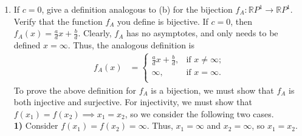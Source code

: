 \documentclass[a4paper,11pt]{article}
\newcommand{\ds}{\displaystyle}
\begin{document}
{{\begin{enumerate}[leftmargin=*]
\begin{enumerate}
					For surjectivity, we must show that $\ds{\forall y \in \text{im}(f_A), \exists \:x \text{ s.t. } f_A(x) = y}$, so we again consider the same three cases.\\
					\textbf{1)} Consider $\ds{f(x) = y_0}$. Thus, $\ds{x = \infty}$.\\
					\textbf{2)} Consider $\ds{f(x) = \infty}$. Thus, $\ds{x = x_0}$.\\
					\textbf{3)} Consider $\ds{f(x) = \frac{ax+b}{cx+d}}$. Thus,
					\begin{align*}
						f_A(x) & = \frac{ax + b}{cx + d}\\
						(cx + d)f_A(x) & = ax + b\\
						df_A(x) - b & = ax - cxf_A(x)\\
						\therefore x & = \frac{df_A(x) - b}{-cf_A(x) + a}
					\end{align*}
					Note that $\ds{f_A(x) \neq y_0}$ in case \textbf{3)}, as it has been covered in case \textbf{1)}, so there always exists an $\ds{x}$ in the final line of case \textbf{3)}. Clearly, $\ds{f_A}$ is surjective, as it is surjective for each of the cases, which correspond to the piecewise branches of the definition of $\ds{f_A}$. Thus, $\ds{f_A}$ is bijective.
					\bigbreak
				\item If $\ds{c = 0}$, give a definition analogous to (b) for the bijection $\ds{f_A : \mathbb{R}P^1 \rightarrow \mathbb{R}P^1}$. Verify that the function $\ds{f_A}$ you define is bijective.
					\bigbreak
					If $\ds{c = 0}$, then $\ds{f_A(x) = \frac{a}{d}x + \frac{b}{d}}$. Clearly, $\ds{f_A}$ has no asymptotes, and only needs to be defined $\ds{x = \infty}$. Thus, the analogous definition is 
					\begin{align*}
						f_A(x) & = 
						\begin{cases}
							\frac{a}{d}x + \frac{b}{d}, & \text{if } x \neq \infty;\\
							\infty, & \text{if } x = \infty.\\
						\end{cases}
					\end{align*}
					To prove the above definition for $\ds{f_A}$ is a bijection, we must show that $\ds{f_A}$ is both injective and surjective. For injectivity, we must show that $\ds{f(x_1) = f(x_2) \implies x_1 = x_2}$, so we consider the following two cases.\\
					\textbf{1)} Consider $\ds{f(x_1) = f(x_2) = \infty}$. Thus, $\ds{x_1 = \infty}$ and $\ds{x_2 = \infty}$, so $\ds{x_1 = x_2}$. \\

\end{enumerate}
\end{enumerate}}}
\end{document}
